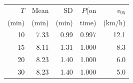 \begin{tabular}{rrrrr}
\toprule
$T$ & Mean & SD & $P$(on & $v_{95}$ \\
(min) & (min) & (min) & time) & (km/h) \\
\midrule
10 & 7.33 & 0.99 & 0.997 & 12.1 \\
15 & 8.11 & 1.31 & 1.000 & 8.3 \\
20 & 8.23 & 1.40 & 1.000 & 6.0 \\
30 & 8.23 & 1.40 & 1.000 & 5.0 \\
\bottomrule
\end{tabular}
